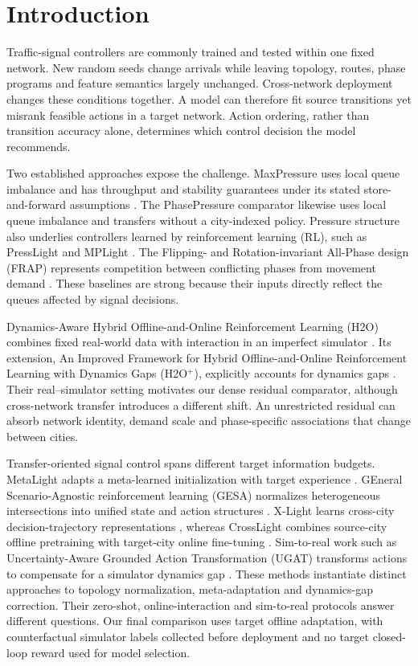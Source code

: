 \section{Introduction}

Traffic-signal controllers are commonly trained and tested within one fixed
network.  New random seeds change arrivals while leaving topology, routes,
phase programs and feature semantics largely unchanged.  Cross-network
deployment changes these conditions together.  A model can therefore fit
source transitions yet misrank feasible actions in a target network.
Action ordering, rather than transition accuracy alone, determines which
control decision the model recommends.

Two established approaches expose the challenge.  MaxPressure uses
local queue imbalance and has throughput and stability guarantees under its
stated store-and-forward assumptions \citep{varaiya2013maxpressure}.  The
PhasePressure comparator likewise uses local queue imbalance and
transfers without a city-indexed policy.  Pressure structure also underlies
controllers learned by reinforcement learning (RL),
such as PressLight and MPLight
\citep{wei2019presslight,chen2020thousandlights}.  The Flipping- and
Rotation-invariant All-Phase design (FRAP) represents competition
between conflicting phases from movement demand
\citep{zheng2019frap}.  These baselines are strong because their inputs
directly reflect the queues affected by signal decisions.

Dynamics-Aware Hybrid Offline-and-Online Reinforcement Learning (H2O) combines
fixed real-world data with interaction in an imperfect simulator
\citep{niu2022h2o}.  Its extension, An Improved Framework for Hybrid
Offline-and-Online Reinforcement Learning with Dynamics Gaps (H2O$^+$),
explicitly accounts for dynamics gaps \citep{niu2023h2oplus}.
Their real--simulator setting motivates our dense residual comparator,
although cross-network transfer introduces a different shift.  An
unrestricted residual can absorb network identity, demand scale and
phase-specific associations that change between cities.

Transfer-oriented signal control spans different target information budgets.
MetaLight adapts a meta-learned initialization with target experience
\citep{zang2020metalight}.  GEneral Scenario-Agnostic reinforcement learning
(GESA) normalizes heterogeneous intersections into unified state and action
structures \citep{jiang2024gesa}.  X-Light learns cross-city
decision-trajectory representations \citep{jiang2024xlight}, whereas
CrossLight combines source-city offline pretraining with target-city online fine-tuning
\citep{sun2024crosslight}.  Sim-to-real work such as Uncertainty-Aware Grounded
Action Transformation (UGAT) transforms actions to compensate for a
simulator dynamics gap \citep{da2023ugat}.  These methods instantiate distinct
approaches to topology normalization, meta-adaptation and dynamics-gap
correction.  Their zero-shot, online-interaction and sim-to-real protocols
answer different questions.  Our final comparison uses target offline
adaptation, with counterfactual simulator labels collected before deployment
and no target closed-loop reward used for model selection.

